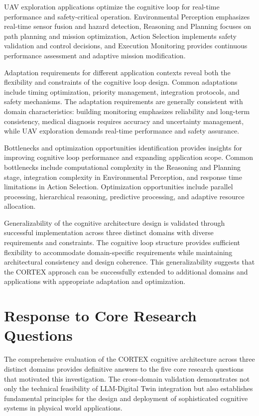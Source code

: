 UAV exploration applications optimize the cognitive loop for real-time performance and safety-critical operation. Environmental Perception emphasizes real-time sensor fusion and hazard detection, Reasoning and Planning focuses on path planning and mission optimization, Action Selection implements safety validation and control decisions, and Execution Monitoring provides continuous performance assessment and adaptive mission modification.

Adaptation requirements for different application contexts reveal both the flexibility and constraints of the cognitive loop design. Common adaptations include timing optimization, priority management, integration protocols, and safety mechanisms. The adaptation requirements are generally consistent with domain characteristics: building monitoring emphasizes reliability and long-term consistency, medical diagnosis requires accuracy and uncertainty management, while UAV exploration demands real-time performance and safety assurance.

Bottlenecks and optimization opportunities identification provides insights for improving cognitive loop performance and expanding application scope. Common bottlenecks include computational complexity in the Reasoning and Planning stage, integration complexity in Environmental Perception, and response time limitations in Action Selection. Optimization opportunities include parallel processing, hierarchical reasoning, predictive processing, and adaptive resource allocation.

Generalizability of the cognitive architecture design is validated through successful implementation across three distinct domains with diverse requirements and constraints. The cognitive loop structure provides sufficient flexibility to accommodate domain-specific requirements while maintaining architectural consistency and design coherence. This generalizability suggests that the CORTEX approach can be successfully extended to additional domains and applications with appropriate adaptation and optimization.

\section{Response to Core Research Questions}

The comprehensive evaluation of the CORTEX cognitive architecture across three distinct domains provides definitive answers to the five core research questions that motivated this investigation. The cross-domain validation demonstrates not only the technical feasibility of LLM-Digital Twin integration but also establishes fundamental principles for the design and deployment of sophisticated cognitive systems in physical world applications.

